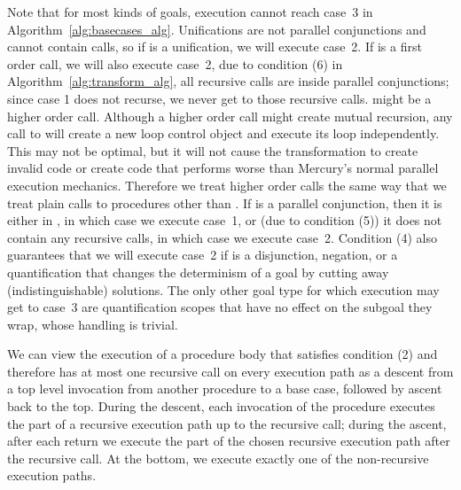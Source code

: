 
Note that for most kinds of goals, execution cannot reach case~3
in Algorithm~\ref{alg:basecases_alg}.
Unifications are not parallel conjunctions and cannot contain calls,
so if  is a unification, we will execute case~2.
If  is a first order call, we will also execute case~2,
due to condition (6) in Algorithm~\ref{alg:transform_alg},
all recursive calls are inside parallel conjunctions;
since case 1 does not recurse,
we never get to those recursive calls.
 might be a higher order call.
Although a higher order call might create mutual recursion,
any call to  will create a new loop control object and execute
its loop independently.
This may not be optimal, but it will not cause the transformation to create
invalid code or create code that performs worse than Mercury's normal
parallel execution mechanics.
Therefore we treat higher order calls the same way that we treat plain calls
to procedures other than .
If  is a parallel conjunction,
then it is either in ,
in which case we execute case~1,
or (due to condition (5))
it does not contain any recursive calls,
in which case we execute case~2.
Condition (4) also guarantees that we will execute case~2
if  is a disjunction, negation,
or a quantification that changes the determinism of a goal
by cutting away (indistinguishable) solutions.
The only other goal type for which execution may get to case~3
are quantification scopes that have no effect on the subgoal they wrap,
whose handling is trivial.

We can view the execution of a procedure body that satisfies condition (2)
and therefore has at most one recursive call on every execution path
as a descent from a top level invocation from another procedure
to a base case, followed by ascent back to the top.
During the descent,
each invocation of the procedure executes
the part of a recursive execution path
up to the recursive call;
during the ascent,
after each return we execute
the part of the chosen recursive execution path after the recursive call.
At the bottom, we execute exactly one of the non-recursive execution paths.

